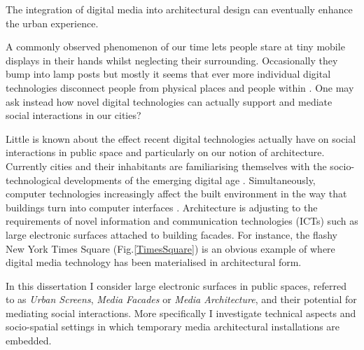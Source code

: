 
The integration of digital media into architectural design can eventually enhance the urban experience. 

A commonly observed phenomenon of our time lets people stare at tiny mobile displays in their hands whilst neglecting their surrounding. Occasionally they bump into lamp posts but mostly it seems that ever more individual digital technologies disconnect people from physical places and people within \cite{Turkle_2012}. One may ask instead how novel digital technologies can actually support and mediate social interactions in our cities?    

Little is known about the effect recent digital technologies actually have on social interactions in public space and particularly on our notion of architecture. 
Currently cities and their inhabitants are familiarising themselves with the socio-technological developments of the emerging digital age \cite{Hemment_2013}. 
Simultaneously, computer technologies increasingly affect the built environment in the way that buildings turn into computer interfaces \cite{Mitchell_1995}.
Architecture is adjusting to the requirements of novel information and communication technologies (ICTs) such as large electronic surfaces attached to building facades. For instance, the flashy New York Times Square (Fig.\ref{TimesSquare}) is an obvious example of where digital media technology has been materialised in architectural form. 

In this dissertation I consider large electronic surfaces in public spaces, referred to as \textit{Urban Screens}, \textit{Media Facades} or \textit{Media Architecture}, and their potential for mediating social interactions. More specifically I investigate technical aspects and socio-spatial settings in which temporary media architectural installations are embedded. 



